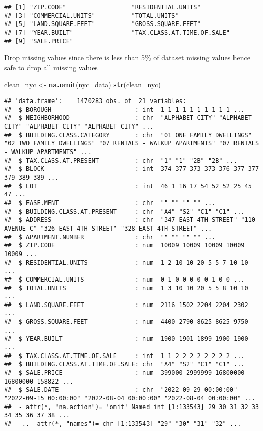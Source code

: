 \documentclass[
]{article}
\newenvironment{Shaded}{\begin{snugshade}}{\end{snugshade}}
\newcommand{\FunctionTok}[1]{\textcolor[rgb]{0.13,0.29,0.53}{\textbf{#1}}}
\newcommand{\NormalTok}[1]{#1}
\newcommand{\OtherTok}[1]{\textcolor[rgb]{0.56,0.35,0.01}{#1}}
\begin{document}
\begin{verbatim}
## [1] "ZIP.CODE"                  "RESIDENTIAL.UNITS"        
## [3] "COMMERCIAL.UNITS"          "TOTAL.UNITS"              
## [5] "LAND.SQUARE.FEET"          "GROSS.SQUARE.FEET"        
## [7] "YEAR.BUILT"                "TAX.CLASS.AT.TIME.OF.SALE"
## [9] "SALE.PRICE"
\end{verbatim}

Drop missing values since there is less than 5\% of dataset missing
values hence safe to drop all missing values

\begin{Shaded}
\begin{Highlighting}[]
\NormalTok{clean\_nyc }\OtherTok{\textless{}{-}} \FunctionTok{na.omit}\NormalTok{(nyc\_data)}
\FunctionTok{str}\NormalTok{(clean\_nyc)}
\end{Highlighting}
\end{Shaded}

\begin{verbatim}
## 'data.frame':    1470283 obs. of  21 variables:
##  $ BOROUGH                       : int  1 1 1 1 1 1 1 1 1 1 ...
##  $ NEIGHBORHOOD                  : chr  "ALPHABET CITY" "ALPHABET CITY" "ALPHABET CITY" "ALPHABET CITY" ...
##  $ BUILDING.CLASS.CATEGORY       : chr  "01 ONE FAMILY DWELLINGS" "02 TWO FAMILY DWELLINGS" "07 RENTALS - WALKUP APARTMENTS" "07 RENTALS - WALKUP APARTMENTS" ...
##  $ TAX.CLASS.AT.PRESENT          : chr  "1" "1" "2B" "2B" ...
##  $ BLOCK                         : int  374 377 373 373 376 377 377 379 389 389 ...
##  $ LOT                           : int  46 1 16 17 54 52 52 25 45 47 ...
##  $ EASE.MENT                     : chr  "" "" "" "" ...
##  $ BUILDING.CLASS.AT.PRESENT     : chr  "A4" "S2" "C1" "C1" ...
##  $ ADDRESS                       : chr  "347 EAST 4TH STREET" "110 AVENUE C" "326 EAST 4TH STREET" "328 EAST 4TH STREET" ...
##  $ APARTMENT.NUMBER              : chr  "" "" "" "" ...
##  $ ZIP.CODE                      : num  10009 10009 10009 10009 10009 ...
##  $ RESIDENTIAL.UNITS             : num  1 2 10 10 20 5 5 7 10 10 ...
##  $ COMMERCIAL.UNITS              : num  0 1 0 0 0 0 0 1 0 0 ...
##  $ TOTAL.UNITS                   : num  1 3 10 10 20 5 5 8 10 10 ...
##  $ LAND.SQUARE.FEET              : num  2116 1502 2204 2204 2302 ...
##  $ GROSS.SQUARE.FEET             : num  4400 2790 8625 8625 9750 ...
##  $ YEAR.BUILT                    : num  1900 1901 1899 1900 1900 ...
##  $ TAX.CLASS.AT.TIME.OF.SALE     : int  1 1 2 2 2 2 2 2 2 2 ...
##  $ BUILDING.CLASS.AT.TIME.OF.SALE: chr  "A4" "S2" "C1" "C1" ...
##  $ SALE.PRICE                    : num  399000 2999999 16800000 16800000 158822 ...
##  $ SALE.DATE                     : chr  "2022-09-29 00:00:00" "2022-09-15 00:00:00" "2022-08-04 00:00:00" "2022-08-04 00:00:00" ...
##  - attr(*, "na.action")= 'omit' Named int [1:133543] 29 30 31 32 33 34 35 36 37 38 ...
##   ..- attr(*, "names")= chr [1:133543] "29" "30" "31" "32" ...
\end{verbatim}
\end{document}

